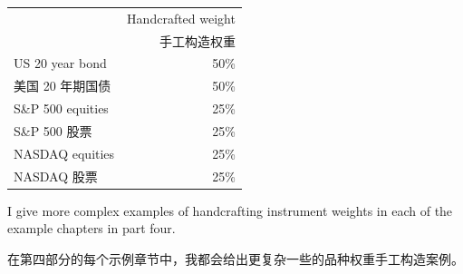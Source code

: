 \begin{bilingualtableblock} \begingroup \small \centering \begin{tabular}{@{} lr@{}}
\toprule
& Handcrafted weight \\
& 手工构造权重 \\
\midrule
US 20 year bond & 50\% \\
美国 20 年期国债 & 50\% \\
S\&P 500 equities & 25\% \\
S\&P 500 股票 & 25\% \\
NASDAQ equities & 25\% \\
NASDAQ 股票 & 25\% \\
\bottomrule
\end{tabular}
\par \endgroup \end{bilingualtableblock}

\begin{englishblock} I give more complex examples of handcrafting instrument weights in each of the example chapters in part four. \end{englishblock}

\begin{chineseblock}在第四部分的每个示例章节中，我都会给出更复杂一些的品种权重手工构造案例。\end{chineseblock}



